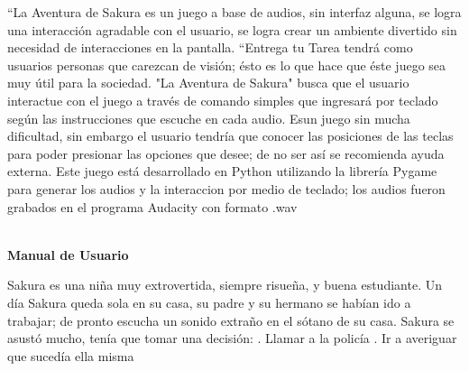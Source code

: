 \documentclass[12pt]{report}
\begin{document}

``La Aventura de Sakura es un juego a base de audios, sin interfaz alguna, se logra una interacción agradable con el usuario, se logra crear un ambiente divertido sin necesidad de interacciones en la pantalla.
\newline
\newline
``Entrega tu Tarea tendrá como usuarios personas que carezcan de visión; ésto es lo que hace que éste juego sea muy útil para la sociedad. "La Aventura de Sakura" busca que el usuario interactue con el juego a través de comando simples que ingresará por teclado según las instrucciones que escuche en cada audio.
\newline
\newline
Esun juego sin mucha dificultad, sin embargo el usuario tendría que conocer las posiciones de las teclas para poder presionar las opciones que desee; de no ser así se recomienda ayuda externa.
\newline
\newline
Este juego está desarrollado en Python utilizando la librería Pygame para generar los audios y la interaccion por medio de teclado; los audios fueron grabados en el programa Audacity con formato .wav


\newpage
\begin{center}
	\begingroup
		
		\Huge{\textbf{\\Manual de Usuario	\vspace{1em}}}

	\endgroup

\end{center}

Sakura es una niña muy extrovertida, siempre risueña, y buena estudiante.
Un día Sakura queda sola en su casa, su padre y su hermano se habían ido a trabajar; de pronto escucha un sonido extraño en el sótano de su casa. Sakura se asustó mucho, tenía que tomar una decisión:
\newline
{}.	Llamar a la policía
\newline
{}.	Ir a averiguar que sucedía ella misma
\newline
\newline
\end{document}
